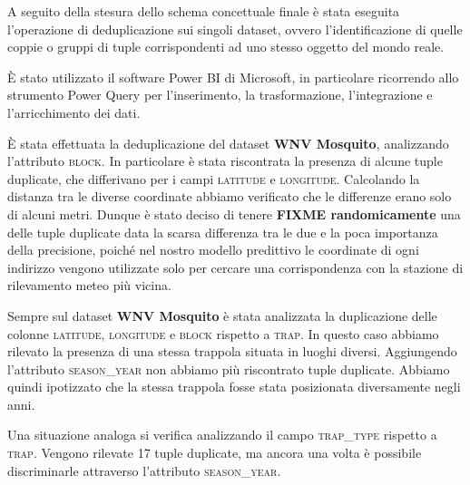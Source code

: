 A seguito della stesura dello schema concettuale finale è 
stata eseguita l'operazione di deduplicazione sui singoli dataset, ovvero 
l'identificazione di quelle coppie o gruppi di tuple corrispondenti ad uno 
stesso oggetto del mondo reale.

È stato utilizzato il software Power BI di Microsoft, 
in particolare ricorrendo allo strumento Power Query per l'inserimento, la 
trasformazione, l'integrazione e l'arricchimento dei dati.

È stata effettuata la deduplicazione del dataset \textbf{WNV Mosquito}, 
analizzando l'attributo \textsc{block}. In particolare è stata riscontrata 
la presenza di alcune tuple duplicate, che differivano per i campi 
\textsc{latitude} e \textsc{longitude}. Calcolando la distanza tra le diverse 
coordinate abbiamo verificato che le differenze erano solo di alcuni metri.
Dunque è stato deciso di tenere \textbf{FIXME randomicamente} una delle tuple 
duplicate data la scarsa differenza tra le due e la poca importanza della 
precisione, poiché nel nostro modello predittivo le coordinate di ogni 
indirizzo vengono utilizzate solo per cercare una corrispondenza con la 
stazione di rilevamento meteo più vicina.

Sempre sul dataset \textbf{WNV Mosquito} è stata analizzata la duplicazione 
delle colonne \textsc{latitude}, \textsc{longitude} e \textsc{block} rispetto a 
\textsc{trap}. In questo caso abbiamo rilevato la presenza di una stessa 
trappola situata in luoghi diversi. Aggiungendo l'attributo 
\textsc{season\_year} non abbiamo più riscontrato tuple duplicate. Abbiamo 
quindi ipotizzato che la stessa trappola fosse stata posizionata diversamente 
negli anni.

Una situazione analoga si verifica analizzando il campo \textsc{trap\_type} 
rispetto a \textsc{trap}. Vengono rilevate 17 tuple duplicate, ma ancora una 
volta è possibile discriminarle attraverso l'attributo \textsc{season\_year}.
